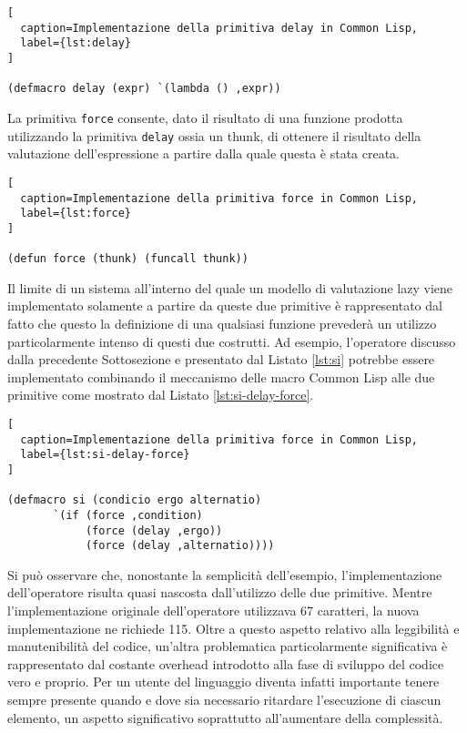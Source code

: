 \begin{lstlisting}[
  caption=Implementazione della primitiva delay in Common Lisp,
  label={lst:delay}
]

(defmacro delay (expr) `(lambda () ,expr))

\end{lstlisting}

La primitiva \texttt{force} consente, dato il risultato di una funzione prodotta utilizzando la primitiva \texttt{delay} ossia un thunk, di ottenere il risultato della valutazione dell'espressione a partire dalla quale questa è stata creata.

\begin{lstlisting}[
  caption=Implementazione della primitiva force in Common Lisp,
  label={lst:force}
]

(defun force (thunk) (funcall thunk))

\end{lstlisting}

Il limite di un sistema all'interno del quale un modello di valutazione lazy viene implementato solamente a partire da queste due primitive è rappresentato dal fatto che questo la definizione di una qualsiasi funzione prevederà un utilizzo particolarmente intenso di questi due costrutti. Ad esempio, l'operatore discusso dalla precedente Sottosezione e presentato dal Listato \ref{lst:si} potrebbe essere implementato combinando il meccanismo delle macro Common Lisp alle due primitive come mostrato dal Listato \ref{lst:si-delay-force}.

\begin{lstlisting}[
  caption=Implementazione della primitiva force in Common Lisp,
  label={lst:si-delay-force}
]

(defmacro si (condicio ergo alternatio)
       `(if (force ,condition)
            (force (delay ,ergo))
            (force (delay ,alternatio))))

\end{lstlisting}

Si può osservare che, nonostante la semplicità dell'esempio, l'implementazione dell'operatore risulta quasi nascosta dall'utilizzo delle due primitive. Mentre l'implementazione originale dell'operatore utilizzava 67 caratteri, la nuova implementazione ne richiede 115. Oltre a questo aspetto relativo alla leggibilità e manutenibilità del codice, un'altra problematica particolarmente significativa è rappresentato dal costante overhead introdotto alla fase di sviluppo del codice vero e proprio. Per un utente del linguaggio diventa infatti importante tenere sempre presente quando e dove sia necessario ritardare l'esecuzione di ciascun elemento, un aspetto significativo soprattutto all'aumentare della complessità.

